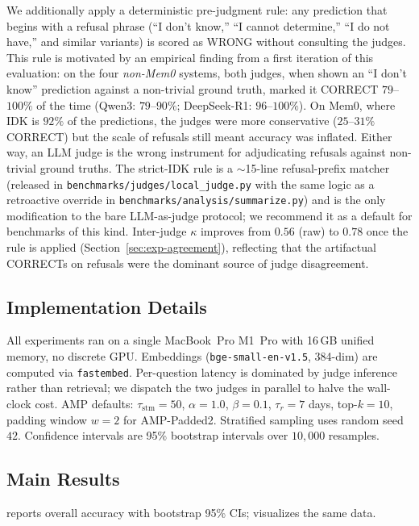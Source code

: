 We additionally apply a deterministic pre-judgment rule: any prediction that begins with a refusal phrase (``I don't know,'' ``I cannot determine,'' ``I do not have,'' and similar variants) is scored as WRONG without consulting the judges. This rule is motivated by an empirical finding from a first iteration of this evaluation: on the four \emph{non-Mem0} systems, both judges, when shown an ``I don't know'' prediction against a non-trivial ground truth, marked it CORRECT $79$--$100\%$ of the time (Qwen3: $79$--$90\%$; DeepSeek-R1: $96$--$100\%$). On Mem0, where IDK is $92\%$ of the predictions, the judges were more conservative ($25$--$31\%$ CORRECT) but the scale of refusals still meant accuracy was inflated. Either way, an LLM judge is the wrong instrument for adjudicating refusals against non-trivial ground truths. The strict-IDK rule is a $\sim$15-line refusal-prefix matcher (released in \texttt{benchmarks/judges/local\_judge.py} with the same logic as a retroactive override in \texttt{benchmarks/analysis/summarize.py}) and is the only modification to the bare LLM-as-judge protocol; we recommend it as a default for benchmarks of this kind. Inter-judge $\kappa$ improves from $0.56$ (raw) to $0.78$ once the rule is applied (Section~\ref{sec:exp-agreement}), reflecting that the artifactual CORRECTs on refusals were the dominant source of judge disagreement.

\subsection{Implementation Details}
\label{sec:exp-impl}

All experiments ran on a single MacBook~Pro M1~Pro with 16\,GB unified memory, no discrete GPU. Embeddings (\texttt{bge-small-en-v1.5}, 384-dim) are computed via \texttt{fastembed}. Per-question latency is dominated by judge inference rather than retrieval; we dispatch the two judges in parallel to halve the wall-clock cost. AMP defaults: $\tau_{\text{stm}} = 50$, $\alpha = 1.0$, $\beta = 0.1$, $\tau_r = 7$ days, top-$k = 10$, padding window $w = 2$ for AMP-Padded2. Stratified sampling uses random seed $42$. Confidence intervals are 95\% bootstrap intervals over $10{,}000$ resamples.

\subsection{Main Results}
\label{sec:exp-main}

 reports overall accuracy with bootstrap 95\% CIs;  visualizes the same data.

